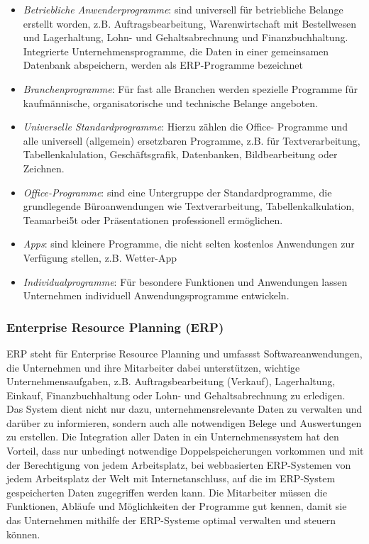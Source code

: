\documentclass[a4paper, 12pt]{report}
\begin{document}
\begin{multicols}{2}
\begin{itemize}
    \item \emph{Betriebliche Anwenderprogramme}: sind universell für
	betriebliche Belange erstellt worden, z.B. Auftragsbearbeitung,
	Warenwirtschaft mit Bestellwesen und Lagerhaltung, Lohn- und
	Gehaltsabrechnung und Finanzbuchhaltung. Integrierte
	Unternehmensprogramme, die Daten in einer gemeinsamen Datenbank
	abspeichern, werden als ERP-Programme bezeichnet
    \item \emph{Branchenprogramme}: Für fast alle Branchen werden spezielle
	Programme für kaufmännische, organisatorische und technische Belange
	angeboten.
    \item \emph{Universelle Standardprogramme}: Hierzu zählen die Office-
	Programme und alle universell (allgemein) ersetzbaren Programme, z.B.
	für Textverarbeitung, Tabellenkalulation, Geschäftsgrafik, Datenbanken,
	Bildbearbeitung oder Zeichnen.
    \item \emph{Office-Programme}: sind eine Untergruppe der Standardprogramme,
	die grundlegende Büroanwendungen wie Textverarbeitung,
	Tabellenkalkulation, Teamarbei5t oder Präsentationen professionell
	ermöglichen.
    \item \emph{Apps}: sind kleinere Programme, die nicht selten kostenlos
	Anwendungen zur Verfügung stellen, z.B. Wetter-App
    \item \emph{Individualprogramme}: Für besondere Funktionen und Anwendungen
	lassen Unternehmen individuell Anwendungsprogramme entwickeln.
\end{itemize}

\subsubsection{Enterprise Resource Planning (ERP)}

ERP steht für Enterprise Resource Planning und umfassst Softwareanwendungen, die
Unternehmen und ihre Mitarbeiter dabei unterstützen, wichtige
Unternehmensaufgaben, z.B. Auftragsbearbeitung (Verkauf), Lagerhaltung, Einkauf,
Finanzbuchhaltung oder Lohn- und Gehaltsabrechnung zu erledigen. Das System
dient nicht nur dazu, unternehmensrelevante Daten zu verwalten und darüber zu
informieren, sondern auch alle notwendigen Belege und Auswertungen zu erstellen.
Die Integration aller Daten in ein Unternehmenssystem hat den Vorteil, dass nur
unbedingt notwendige Doppelspeicherungen vorkommen und mit der Berechtigung von
jedem Arbeitsplatz, bei webbasierten ERP-Systemen von jedem Arbeitsplatz der
Welt mit Internetanschluss, auf die im ERP-System gespeicherten Daten
zugegriffen werden kann. Die Mitarbeiter müssen die Funktionen, Abläufe und
Möglichkeiten der Programme gut kennen, damit sie das Unternehmen mithilfe der
ERP-Systeme optimal verwalten und steuern können. \\


\end{multicols}
\end{document}
